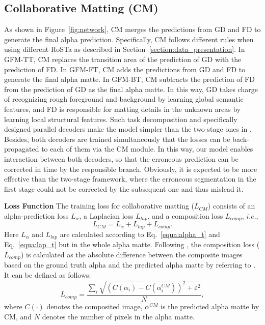 \documentclass[twocolumn]{svjour3}
\begin{document}
\subsection{Collaborative Matting (CM)}
As shown in Figure~\ref{fig:network}, CM merges the predictions from GD and FD to generate the final alpha prediction. Specifically, CM follows different rules when using different RoSTa as described in Section~\ref{section:data_presentation}. In GFM-TT, CM replaces the transition area of the prediction of GD with the prediction of FD. In GFM-FT, CM adds the predictions from GD and FD to generate the final alpha matte. In GFM-BT, CM subtracts the prediction of FD from the prediction of GD as the final alpha matte. In this way, GD takes charge of recognizing rough foreground and background by learning global semantic features, and FD is responsible for matting details in the unknown areas by learning local structural features. Such task decomposition and specifically designed parallel decoders make the model simpler than the two-stage ones in \citep{chen2018semantic,zhang2019late}. Besides, both decoders are trained simultaneously that the losses can be back-propagated to each of them via the CM module. In this way, our model enables interaction between both decoders, so that the erroneous prediction can be corrected in time by the responsible branch. Obviously, it is expected to be more effective than the two-stage framework, where the erroneous segmentation in the first stage could not be corrected by the subsequent one and thus mislead it.

\textbf{Loss Function} The training loss for collaborative matting ($L_{CM}$) consists of an alpha-prediction loss $L_{\alpha}$, a Laplacian loss $L_{lap}$, and a composition loss $L_{comp}$, $i.e.$,
\begin{equation}
L_{CM} = L_{\alpha} + L_{lap} + L_{comp}.
\end{equation}
Here $L_{\alpha}$ and $L_{lap}$ are calculated according to Eq.~\eqref{equa:alpha_t} and Eq.~\eqref{equa:lap_t} but in the whole alpha matte. Following \citep{xu2017deep}, the composition loss ($L_{comp}$) is calculated as the absolute difference between the composite images based on the ground truth alpha and the predicted alpha matte by referring to \citep{levin2007closed}. It can be defined as follows:
\begin{equation}
L_{comp} = \frac{\sum_{i}\sqrt{\left (C(\alpha_{i})-C(\alpha^{CM}_{i}) \right )^{2}+\varepsilon^{2}}} {N},
\end{equation}
where $C\left( \cdot \right)$ denotes the composited image, $\alpha^{CM}$ is the predicted alpha matte by CM, and $N$ denotes the number of pixels in the alpha matte.
\end{document}
